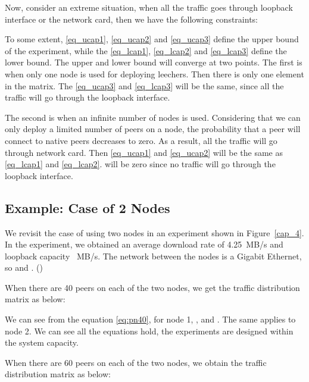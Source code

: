 \documentclass[10pt,letterpaper,twocolumn]{article}
\begin{document}
Now, consider an extreme situation, when all the traffic goes through
loopback interface or the network card, then we have the following
constraints: 








To some extent, \eqref{eq_ucap1}, \eqref{eq_ucap2} and
\eqref{eq_ucap3} define the upper bound of the experiment, while the
\eqref{eq_lcap1}, \eqref{eq_lcap2} and \eqref{eq_lcap3} define the
lower bound. The upper and lower bound will converge at two
points. The first is when only one node is used for deploying
leechers. Then there is only one element  in the matrix. The
\eqref{eq_ucap3} and \eqref{eq_lcap3} will be the same, since all the
traffic will go through the loopback interface.

The second is when an infinite number of nodes is used. Considering
that we can only deploy a limited number of peers on a node, the
probability that a peer will connect to native peers decreases to
zero. As a result, all the traffic will go through network card. Then
\eqref{eq_ucap1} and \eqref{eq_ucap2} will be the same as
\eqref{eq_lcap1} and \eqref{eq_lcap2}.  will be zero since no
traffic will go through the loopback interface.





\subsection{Example: Case of 2 Nodes }
\label{sec:example:-case-2}

We revisit the case of using two nodes in an experiment shown in
Figure~\ref{cap_4}. In the experiment, we obtained an average download
rate of 4.25~MB/s and loopback capacity ~MB/s. The network
between the nodes is a Gigabit Ethernet, so  and
. ()

When there are 40 peers on each of the two nodes, we get the traffic
distribution matrix  as below:



We can see from the equation \eqref{eq:pn40}, for node 1,
,  and
. The same applies to node 2. We can
see all the equations hold, the experiments are designed within the
system capacity.



When there are 60 peers on each of the two nodes, we obtain the traffic
distribution matrix  as below:
\end{document}
